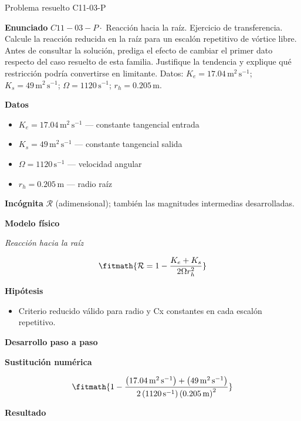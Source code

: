 \documentclass[10pt,openany]{book}
\begin{document}
\begin{studiumworked}{Problema resuelto C11-03-P}


\noindent\textbf{Enunciado}
\(C11-03-P \cdot\) Reacción hacia la raíz. Ejercicio de transferencia. Calcule la reacción reducida en la raíz para un escalón repetitivo de vórtice libre. Antes de consultar la solución, prediga el efecto de cambiar el primer dato respecto del caso resuelto de esta familia. Justifique la tendencia y explique qué restricción podría convertirse en limitante. Datos: \(K_e=17.04\, \mathrm{m}^{2}\,\mathrm{s}^{-1}\); \(K_s=49\, \mathrm{m}^{2}\,\mathrm{s}^{-1}\); \(\Omega=1120\, \mathrm{s}^{-1}\); \(r_h=0.205\, \mathrm{m}\).

\noindent\textbf{Datos}
\begin{itemize}
\item $K_e = 17.04\,\mathrm{m}^{2}\,\mathrm{s}^{-1}$ — constante tangencial entrada
\item $K_s = 49\,\mathrm{m}^{2}\,\mathrm{s}^{-1}$ — constante tangencial salida
\item $\Omega = 1120\,\mathrm{s}^{-1}$ — velocidad angular
\item $r_h = 0.205\,\mathrm{m}$ — radio raíz
\end{itemize}

\noindent\textbf{Incógnita}
$\mathcal{R}$ (adimensional); también las magnitudes intermedias desarrolladas.

\noindent\textbf{Modelo físico}

\noindent\textit{Reacción hacia la raíz}

\[
\fitmath{\mathcal R=1 - \frac{K_e + K_s}{2 \Omega r_h^{2}}}
\]

\noindent\textbf{Hipótesis}
\begin{itemize}
\item Criterio reducido válido para radio y Cx constantes en cada escalón repetitivo.
\end{itemize}

\noindent\textbf{Desarrollo paso a paso}



\noindent\textbf{Sustitución numérica}

\[
\fitmath{1 - \frac{\left(17.04\,\mathrm{m}^{2}\,\mathrm{s}^{-1}\right) + \left(49\,\mathrm{m}^{2}\,\mathrm{s}^{-1}\right)}{2 \left(1120\,\mathrm{s}^{-1}\right) \left(0.205\,\mathrm{m}\right)^{2}}}
\]

\noindent\textbf{Resultado}


\end{studiumworked}
\end{document}
